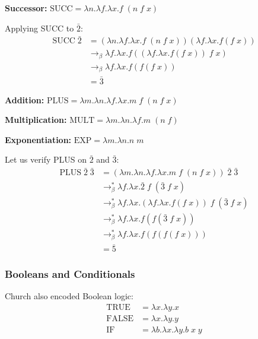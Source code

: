 \begin{example}
\textbf{Successor:} $\text{SUCC} = \lambda n.\lambda f.\lambda x. f\;(n\; f\; x)$

Applying SUCC to $\bar{2}$:
\begin{align*}
\text{SUCC}\; \bar{2}
&= (\lambda n.\lambda f.\lambda x. f\;(n\; f\; x))(\lambda f.\lambda x. f(f\; x)) \\
&\to_\beta \lambda f.\lambda x. f((\lambda f.\lambda x. f(f\; x))\; f\; x) \\
&\to_\beta \lambda f.\lambda x. f(f(f\; x)) \\
&= \bar{3}
\end{align*}

\textbf{Addition:} $\text{PLUS} = \lambda m.\lambda n.\lambda f.\lambda x. m\; f\;(n\; f\; x)$

\textbf{Multiplication:} $\text{MULT} = \lambda m.\lambda n.\lambda f. m\;(n\; f)$

\textbf{Exponentiation:} $\text{EXP} = \lambda m.\lambda n. n\; m$

Let us verify PLUS on $\bar{2}$ and $\bar{3}$:
\begin{align*}
\text{PLUS}\; \bar{2}\; \bar{3}
&= (\lambda m.\lambda n.\lambda f.\lambda x. m\; f\;(n\; f\; x))\; \bar{2}\; \bar{3} \\
&\to_\beta^* \lambda f.\lambda x. \bar{2}\; f\;(\bar{3}\; f\; x) \\
&\to_\beta^* \lambda f.\lambda x. (\lambda f.\lambda x. f(f\; x))\; f\;(\bar{3}\; f\; x) \\
&\to_\beta^* \lambda f.\lambda x. f(f(\bar{3}\; f\; x)) \\
&\to_\beta^* \lambda f.\lambda x. f(f(f(f\; x))) \\
&= \bar{5}
\end{align*}
\end{example}

\subsubsection*{Booleans and Conditionals}

Church also encoded Boolean logic:
\begin{align*}
\text{TRUE} &= \lambda x.\lambda y. x \\
\text{FALSE} &= \lambda x.\lambda y. y \\
\text{IF} &= \lambda b.\lambda x.\lambda y. b\; x\; y
\end{align*}

